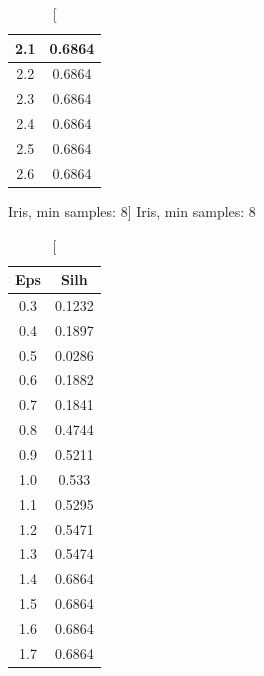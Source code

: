 \documentclass{classrep}
\begin{document}
{{{\begin{table}[!htbp]
\begin{minipage}{.24\textwidth}
\begin{tabular}{|c|c|}
                            2.1 & 0.6864 \\ \hline
                            2.2 & 0.6864 \\ \hline
                            2.3 & 0.6864 \\ \hline
                            2.4 & 0.6864 \\ \hline
                            2.5 & 0.6864 \\ \hline
                            2.6 & 0.6864 \\ \hline
                        \end{tabular}
                        \caption
                        [Iris, min samples: 8]
                        {Iris, min samples: 8}
                        \label{db_scan_table_Iris_manh_min_sample8}
                    \end{minipage}
                    \hfill
                    \begin{minipage}{.24\textwidth}
                        \centering
                        \begin{tabular}{|c|c|}
                            \hline
                            Eps & Silh \\ \hline
                            0.3 & 0.1232 \\ \hline
                            0.4 & 0.1897 \\ \hline
                            0.5 & 0.0286 \\ \hline
                            0.6 & 0.1882 \\ \hline
                            0.7 & 0.1841 \\ \hline
                            0.8 & 0.4744 \\ \hline
                            0.9 & 0.5211 \\ \hline
                            1.0 & 0.533 \\ \hline
                            1.1 & 0.5295 \\ \hline
                            1.2 & 0.5471 \\ \hline
                            1.3 & 0.5474 \\ \hline
                            1.4 & 0.6864 \\ \hline
                            1.5 & 0.6864 \\ \hline
                            1.6 & 0.6864 \\ \hline
                            1.7 & 0.6864 \\ \hline

\end{tabular}
\end{minipage}
\end{table}}}}
\end{document}
